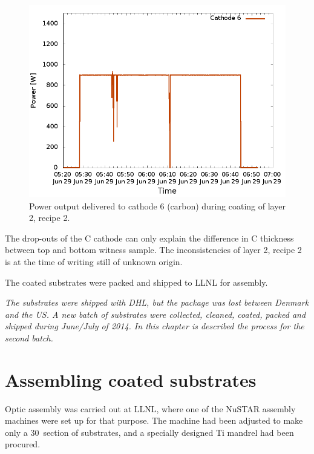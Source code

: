 \begin{figure}[htbp]
  \centering  \includegraphics[width=0.7\linewidth]{figures/cast/power_cat6.png}
  \caption{\footnotesize Power output delivered to cathode 6 (carbon) during coating of layer 2, recipe 2. }
  \label{fig:cast_coatings_power_recipe2_layer2}
\end{figure}

The drop-outs of the C cathode can only explain the difference in C thickness between top and bottom witness sample. The inconsistencies of layer 2, recipe 2 is at the time of writing still of unknown origin.

The coated substrates were packed and shipped to LLNL for assembly.

\emph{The substrates were shipped with DHL, but the package was lost between Denmark and the US. A new batch of substrates were collected, cleaned, coated, packed and shipped during June/July of 2014. In this chapter is described the process for the second batch.}

\section{Assembling coated substrates}
Optic assembly was carried out at LLNL, where one of the NuSTAR assembly machines were set up for that purpose. The machine had been adjusted to make only a 30\degr\ section of substrates, and a specially designed Ti mandrel had been procured.

